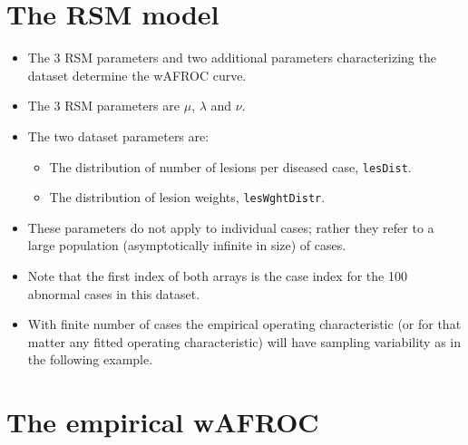 \documentclass[]{book}
\newenvironment{Shaded}{\begin{snugshade}}{\end{snugshade}}
\newcommand{\CommentTok}[1]{\textcolor[rgb]{0.56,0.35,0.01}{\textit{#1}}}
\newcommand{\KeywordTok}[1]{\textcolor[rgb]{0.13,0.29,0.53}{\textbf{#1}}}
\newcommand{\NormalTok}[1]{#1}
\newcommand{\OperatorTok}[1]{\textcolor[rgb]{0.81,0.36,0.00}{\textbf{#1}}}
\providecommand{\tightlist}{%
  \setlength{\itemsep}{0pt}\setlength{\parskip}{0pt}}
\begin{document}
\hypertarget{the-rsm-model}{%
\section{The RSM model}\label{the-rsm-model}}

\begin{itemize}
\tightlist
\item
  The 3 RSM parameters and two additional parameters characterizing the dataset determine the wAFROC curve.
\item
  The 3 RSM parameters are \(\mu\), \(\lambda\) and \(\nu\).
\item
  The two dataset parameters are:

  \begin{itemize}
  \tightlist
  \item
    The distribution of number of lesions per diseased case, \texttt{lesDist}.
  \item
    The distribution of lesion weights, \texttt{lesWghtDistr}.
  \end{itemize}
\item
  These parameters do not apply to individual cases; rather they refer to a large population (asymptotically infinite in size) of cases.
\end{itemize}

\begin{Shaded}
\end{Shaded}

\begin{itemize}
\tightlist
\item
  Note that the first index of both arrays is the case index for the 100 abnormal cases in this dataset.
\item
  With finite number of cases the empirical operating characteristic (or for that matter any fitted operating characteristic) will have sampling variability as in the following example.
\end{itemize}

\hypertarget{the-empirical-wafroc}{%
\section{The empirical wAFROC}\label{the-empirical-wafroc}}
\end{document}
